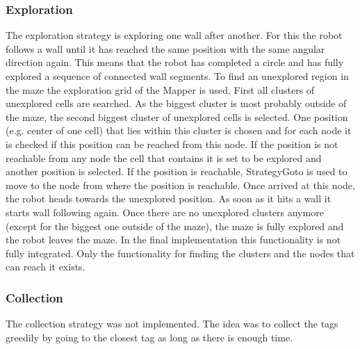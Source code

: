 \subsubsection{Exploration}
The exploration strategy is exploring one wall after another. For this the robot follows a wall until it has reached the same position with the same angular direction again. This means that the robot has completed a circle and has fully explored a sequence of connected wall segments. To find an unexplored region in the maze the exploration grid of the Mapper is used. 
First all clusters of unexplored cells are searched. As the biggest cluster is most probably outside of the maze, the second biggest cluster of unexplored cells is selected. One position (e.g. center of one cell) that lies within this cluster is chosen and for each node it is checked if this position can be reached from this node. If the position is not reachable from any node the cell that contains it is set to be explored and another position is selected. If the position is reachable, StrategyGoto is used to move to the node from where the position is reachable. Once arrived at this node, the robot heads towards the unexplored position. As soon as it hits a wall it starts wall following again. Once there are no unexplored clusters anymore (except for the biggest one outside of the maze), the maze is fully explored and the robot leaves the maze. 
In the final implementation this functionality is not fully integrated. Only the functionality for finding the clusters and the nodes that can reach it exists. 

\subsubsection{Collection}
The collection strategy was not implemented. The idea was to collect the tags greedily by going to the closest tag as long as there is enough time.